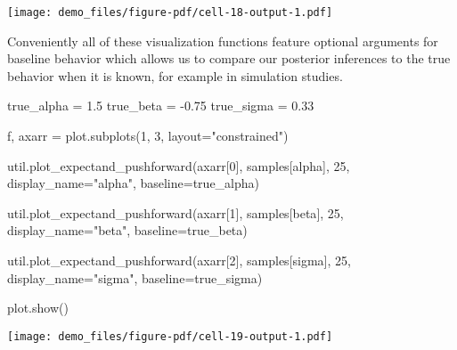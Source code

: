 \documentclass[
  letterpaper,
  DIV=11,
  numbers=noendperiod]{scrartcl}
\newenvironment{Shaded}{\begin{snugshade}}{\end{snugshade}}
\newcommand{\DecValTok}[1]{\textcolor[rgb]{0.68,0.00,0.00}{#1}}
\newcommand{\FloatTok}[1]{\textcolor[rgb]{0.68,0.00,0.00}{#1}}
\newcommand{\NormalTok}[1]{\textcolor[rgb]{0.00,0.23,0.31}{#1}}
\newcommand{\OperatorTok}[1]{\textcolor[rgb]{0.37,0.37,0.37}{#1}}
\newcommand{\StringTok}[1]{\textcolor[rgb]{0.13,0.47,0.30}{#1}}
\begin{document}
\texttt{[image: demo\_files/figure-pdf/cell-18-output-1.pdf]}

Conveniently all of these visualization functions feature optional
arguments for baseline behavior which allows us to compare our posterior
inferences to the true behavior when it is known, for example in
simulation studies.

\begin{Shaded}
\begin{Highlighting}[]
\NormalTok{true\_alpha }\OperatorTok{=} \FloatTok{1.5}
\NormalTok{true\_beta }\OperatorTok{=} \OperatorTok{{-}}\FloatTok{0.75}
\NormalTok{true\_sigma }\OperatorTok{=} \FloatTok{0.33}

\NormalTok{f, axarr }\OperatorTok{=}\NormalTok{ plot.subplots(}\DecValTok{1}\NormalTok{, }\DecValTok{3}\NormalTok{, layout}\OperatorTok{=}\StringTok{"constrained"}\NormalTok{)}

\NormalTok{util.plot\_expectand\_pushforward(axarr[}\DecValTok{0}\NormalTok{], samples[}\StringTok{\textquotesingle{}alpha\textquotesingle{}}\NormalTok{],}
                                \DecValTok{25}\NormalTok{, display\_name}\OperatorTok{=}\StringTok{"alpha"}\NormalTok{,}
\NormalTok{                                baseline}\OperatorTok{=}\NormalTok{true\_alpha)}

\NormalTok{util.plot\_expectand\_pushforward(axarr[}\DecValTok{1}\NormalTok{], samples[}\StringTok{\textquotesingle{}beta\textquotesingle{}}\NormalTok{],}
                                \DecValTok{25}\NormalTok{, display\_name}\OperatorTok{=}\StringTok{"beta"}\NormalTok{,}
\NormalTok{                                baseline}\OperatorTok{=}\NormalTok{true\_beta)}

\NormalTok{util.plot\_expectand\_pushforward(axarr[}\DecValTok{2}\NormalTok{], samples[}\StringTok{\textquotesingle{}sigma\textquotesingle{}}\NormalTok{],}
                                \DecValTok{25}\NormalTok{, display\_name}\OperatorTok{=}\StringTok{"sigma"}\NormalTok{,}
\NormalTok{                                baseline}\OperatorTok{=}\NormalTok{true\_sigma)}

\NormalTok{plot.show()}
\end{Highlighting}
\end{Shaded}

\texttt{[image: demo\_files/figure-pdf/cell-19-output-1.pdf]}
\end{document}
